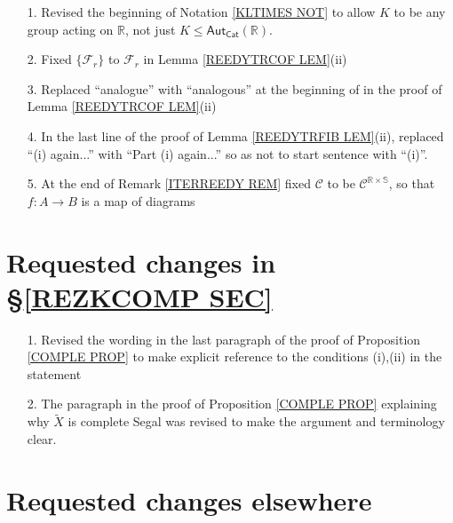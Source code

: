 \documentclass{article}
\begin{document}
\begin{itemize}
	
\item[1.] Revised the beginning of Notation \ref{KLTIMES NOT}
to allow $K$ to be any group acting on $\mathbb{R}$,
not just $K \leq \mathsf{Aut}_{\mathsf{Cat}}(\mathbb{R})$. 	

\item[2.] Fixed $\{\mathcal{F}_r\}$
to $\mathcal{F}_r$ in Lemma \ref{REEDYTRCOF LEM}(ii)
     
\item[3.] Replaced ``analogue'' with ``analogous'' at the beginning of in the proof of Lemma \ref{REEDYTRCOF LEM}(ii)

\item[4.]
In the last line of the proof of Lemma \ref{REEDYTRFIB LEM}(ii),
replaced ``(i) again...'' with ``Part (i) again...''
so as not to start sentence with ``(i)''.

\item[5.]
At the end of Remark \ref{ITERREEDY REM}
fixed $\mathcal{C}$
to be $\mathcal{C}^{\mathbb{R} \times \mathbb{S}}$,
so that $f\colon A \to B$ is a map of diagrams
\end{itemize}








\section{Requested changes in \S \ref{REZKCOMP SEC}}
 

\begin{itemize}
	\item[1.]
	Revised the wording in the last paragraph of the proof of 
	Proposition \ref{COMPLE PROP}
	to make explicit reference to the conditions (i),(ii)
	in the statement
	\item[2.]
	The paragraph in the proof of Proposition \ref{COMPLE PROP}
	explaining why $\widetilde{X}$
	is complete Segal was revised to make the argument and terminology clear.
\end{itemize}



\section{Requested changes elsewhere}
\end{document}
